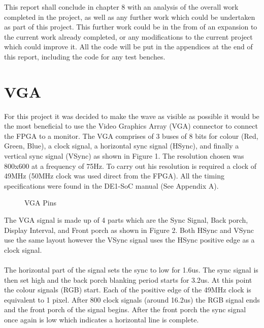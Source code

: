 \documentclass[a4paper,12pt]{article}
\begin{document}
\begin{flushleft}
This report shall conclude in chapter 8 with an analysis of the overall work completed in the project, as well as any further work which could be undertaken as part of this project. This further work could be in the from of an expansion to the current work already completed, or any modifications to the current project which could improve it.  All the code will be put in the appendices at the end of this report, including the code for any test benches. 
\end{flushleft}
\newpage
\section{VGA}
\begin{flushleft}
For this project it was decided to make the wave as visible as possible it would be the most beneficial to use the Video Graphics Array (VGA) connector to connect the FPGA to a monitor. The VGA comprises of 3 buses of 8 bits for colour (Red, Green, Blue), a clock signal, a horizontal sync signal (HSync), and finally a vertical sync signal (VSync) as shown in Figure 1. The resolution chosen was 800x600 at a frequency of 75Hz. To carry out his resolution is required a clock of 49MHz (50MHz clock was used direct from the FPGA). All the timing specifications were found in the DE1-SoC manual (See Appendix A).\\
\begin{figure}[H]
	\centering
	\caption{VGA Pins \cite{terasic_2014}}
\end{figure}
The VGA signal is made up of 4 parts which are the Sync Signal, Back porch, Display Interval, and Front porch as shown in Figure 2. Both HSync and VSync use the same layout however the VSync signal uses the HSync positive edge as a clock signal. \\ \- \\ The horizontal part of the signal sets the sync to low for 1.6us. The sync signal is then set high and the back porch blanking period starts for 3.2us. At this point the colour signals (RGB) start. Each of the positive edge of the 49MHz clock is equivalent to 1 pixel. After 800 clock signals (around 16.2us) the RGB signal ends and the front porch of the signal begins. After the front porch the sync signal once again is low which indicates a horizontal line is complete. \\ \- \\

\end{flushleft}
\end{document}
